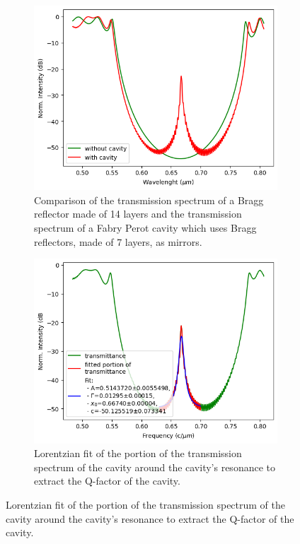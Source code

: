 \begin{figure}[H]
    \centering
    \begin{subfigure}[b]{0.45\linewidth}
        \centering
        \includegraphics[width=\linewidth]{Figures/bragg_vs_cavity_spectrum.png}
        \caption{Comparison of the transmission spectrum of a Bragg reflector made of 14 layers and the transmission spectrum of a Fabry Perot cavity which uses Bragg reflectors, made of 7 layers, as mirrors.}
        \label{fig:bragg_vs_cavity_spectrum}
    \end{subfigure}
    \hfill
    \begin{subfigure}[b]{0.45\linewidth}
        \centering
        \includegraphics[width=\linewidth]{Figures/bragg_cavity_spectrum_fit.png}
        \caption{Lorentzian fit of the portion of the transmission spectrum of the cavity around the cavity's resonance to extract the Q-factor of the cavity.}
        \label{fig:bragg_cavity_spectrum_fit}
    \end{subfigure}
\end{figure}


